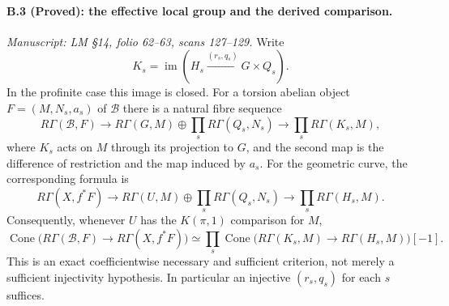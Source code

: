 \paragraph{B.3 (Proved): the effective local group and the derived comparison.}\label{B3}
\textit{Manuscript: LM \S14, folio 62--63, scans 127--129.}
Write
\[
 K_s=\operatorname{im}(H_s\xrightarrow{(r_s,q_s)}G\times Q_s).
\]
In the profinite case this image is closed. For a torsion abelian object
$F=(M,N_s,a_s)$ of $\mathcal B$ there is a natural fibre sequence
\begin{equation}\label{eq:B-effective}
 R\Gamma(\mathcal B,F)\longrightarrow
 R\Gamma(G,M)\oplus\prod_sR\Gamma(Q_s,N_s)
 \longrightarrow\prod_sR\Gamma(K_s,M),
\end{equation}
where $K_s$ acts on $M$ through its projection to $G$, and the second
map is the difference of restriction and the map induced by $a_s$.
For the geometric curve, the corresponding formula is
\begin{equation}\label{eq:B-geometric}
 R\Gamma(X,f^*F)\longrightarrow
 R\Gamma(U,M)\oplus\prod_sR\Gamma(Q_s,N_s)
 \longrightarrow\prod_sR\Gamma(H_s,M).
\end{equation}
Consequently, whenever $U$ has the $K(\pi,1)$ comparison for $M$,
\begin{equation}\label{eq:B-defect}
 \operatorname{Cone}\bigl(R\Gamma(\mathcal B,F)\to R\Gamma(X,f^*F)\bigr)
 \simeq
 \prod_s\operatorname{Cone}\bigl(R\Gamma(K_s,M)\to R\Gamma(H_s,M)\bigr)[-1].
\end{equation}
This is an exact coefficientwise necessary and sufficient criterion,
not merely a sufficient injectivity hypothesis. In particular an
injective $(r_s,q_s)$ for each $s$ suffices.

